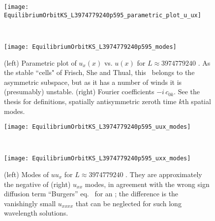 \begin{description}

\begin{figure}
\begin{minipage}{.45\textwidth}
\centering
\texttt{[image: EquilibriumOrbitKS\_L3974779240p595\_parametric\_plot\_u\_ux]}
\end{minipage}
~~~
\begin{minipage}{.45\textwidth}
\centering
\texttt{[image: EquilibriumOrbitKS\_L3974779240p595\_modes]}
\end{minipage}
\caption{\label{fig:MNG_Linfty_u_vs_ux}
(left) Parametric plot of $u_x(x)$ vs. $u(x)$ for $L\approx 3974779240$ \eqv.
As the stable ``cells" of
Frisch, She and Thual, this \eqv\ belongs to the asymmetric subspace,
but as it has a number of winds it is (presumably) unstable.
(right)
Fourier coefficients $-i\,c_{0k}$.
See the thesis for definitions, spatially antisymmetric
zeroth time $k$th spatial modes.
}
\end{figure}

\begin{figure}
\begin{minipage}{.45\textwidth}
\centering
\texttt{[image: EquilibriumOrbitKS\_L3974779240p595\_uux\_modes]}
\end{minipage}
~~~
\begin{minipage}{.45\textwidth}
\centering
\texttt{[image: EquilibriumOrbitKS\_L3974779240p595\_uxx\_modes]}
\end{minipage}
\caption{\label{fig:MNG_Linfty_uux_modes}
(left) Modes of $uu_{x}$ for $L\approx 3974779240$ \eqv.
They are approximately the negative of
(right) $u_{xx}$  modes, in agreement with the wrong sign diffusion term
``Burgers'' eq.~ for an \eqv; the difference is the
vanishingly small  $u_{xxxx}$ that can be neglected for such long
wavelength solutions.
} %
\end{figure}

\end{description}
